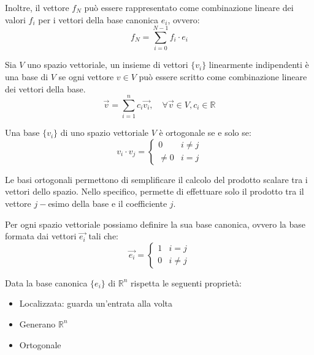 Inoltre, il vettore $f_N$ può essere rappresentato come combinazione lineare dei
valori $f_i$ per i vettori della base canonica $e_i$, ovvero:
\begin{equation}
    f_N = \sum_{i=0}^{N-1} f_i \cdot e_i
\end{equation}
\begin{definizione}
    Sia $V$ uno spazio vettoriale, un insieme di vettori $\{v_i\}$ linearmente
    indipendenti è una base di $V$ se ogni vettore $v \in V$ può essere scritto
    come combinazione lineare dei vettori della base.
    \begin{equation}
        \vec{v} = \sum_{i=1}^{n} c_i \vec{v_i}, \quad \forall \vec{v} \in V, c_i \in \mathbb{R}
    \end{equation}
\end{definizione}
\begin{definizione}
    Una base $\{v_i\}$ di uno spazio vettoriale $V$ è ortogonale se e solo se:
    \begin{equation}
        v_i\cdot v_j = \begin{cases}
            0     & i\ne j \\
            \ne 0 & i = j
        \end{cases}
    \end{equation}
\end{definizione}
Le basi ortogonali permettono di semplificare il calcolo del prodotto scalare
tra i vettori dello spazio. Nello specifico, permette di effettuare solo il
prodotto tra il vettore $j-$esimo della base e il coefficiente $j$.
\begin{nota}
    Per ogni spazio vettoriale possiamo definire la sua base canonica, ovvero
    la base formata dai vettori $\vec{e_i}$ tali che:
    \begin{equation}
        \vec{e_i} = \begin{cases}
            1 & i = j   \\
            0 & i \ne j
        \end{cases}
    \end{equation}
\end{nota}
\begin{nota}
    Data la base canonica $\{e_i\}$ di $\mathbb{R}^n$ rispetta le seguenti proprietà:
    \begin{itemize}
        \item Localizzata: guarda un'entrata alla volta
        \item Generano $\mathbb{R}^n$
        \item Ortogonale
    \end{itemize}
\end{nota}

